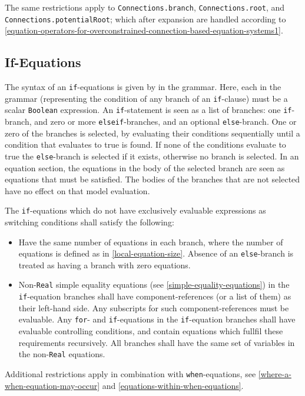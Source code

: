 The same restrictions apply to \lstinline!Connections.branch!, \lstinline!Connections.root!, and \lstinline!Connections.potentialRoot!; which after expansion are handled according to \cref{equation-operators-for-overconstrained-connection-based-equation-systems1}.


\subsection{If-Equations}\label{if-equations}

The syntax of an \lstinline!if!-equations is given by  in the grammar.
Here, each  in the grammar (representing the condition of any branch of an \lstinline!if!-clause) must be a scalar \lstinline!Boolean! expression.
An \lstinline!if!-statement is seen as a list of branches: one \lstinline!if!-branch, and zero or more \lstinline!elseif!-branches, and an optional \lstinline!else!-branch.
One or zero of the branches is selected, by evaluating their conditions sequentially until a condition that evaluates to true is found.
If none of the conditions evaluate to true the \lstinline!else!-branch is selected if it exists, otherwise no branch is selected.
In an equation section, the equations in the body of the selected branch are seen as equations that must be satisfied.
The bodies of the branches that are not selected have no effect on that model evaluation.

The \lstinline!if!-equations which do not have exclusively evaluable expressions as switching conditions shall satisfy the following:
\begin{itemize}
\item
  Have the same number of equations in each branch, where the number of equations is defined as in \cref{local-equation-size}.
  Absence of an \lstinline!else!-branch is treated as having a branch with zero equations.
\item
  Non-\lstinline!Real! simple equality equations (see \cref{simple-equality-equations}) in the \lstinline!if!-equation branches shall have component-references (or a list of them) as their left-hand side.
  Any subscripts for such component-references must be evaluable.
  Any \lstinline!for!- and \lstinline!if!-equations in the \lstinline!if!-equation branches shall have evaluable controlling conditions, and contain equations which fullfil these requirements recursively.
  All branches shall have the same set of variables in the non-\lstinline!Real! equations.
\end{itemize}
Additional restrictions apply in combination with \lstinline!when!-equations, see \cref{where-a-when-equation-may-occur} and \cref{equations-within-when-equations}.

